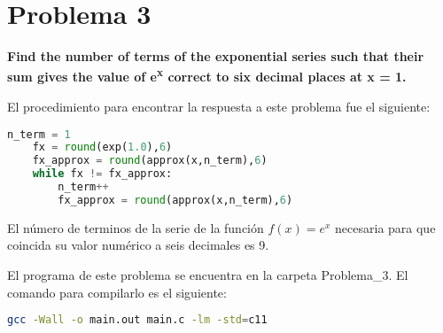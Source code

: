 \section*{Problema 3}
\textbf{Find the number of terms of the exponential series such that their sum gives the value of e\textsuperscript{x} correct to six decimal places at x = 1.}

El procedimiento para encontrar la respuesta a este problema fue el siguiente:
\begin{lstlisting}[language=python]
    n_term = 1
    fx = round(exp(1.0),6)
    fx_approx = round(approx(x,n_term),6)
    while fx != fx_approx:
        n_term++
        fx_approx = round(approx(x,n_term),6)
\end{lstlisting}

El número de terminos de la serie de la función $f(x)=e^x$ necesaria para que coincida su valor numérico a seis decimales es 9.

El programa de este problema se encuentra en la carpeta \textcolor{citecolor}{Problema\_3}. El comando para compilarlo es el siguiente:

\begin{lstlisting}[language=bash]
    gcc -Wall -o main.out main.c -lm -std=c11
\end{lstlisting}